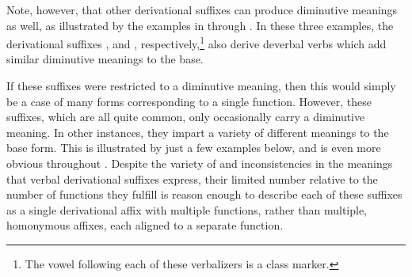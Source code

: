 Note, however, that other derivational suffixes can produce diminutive meanings as well, as illustrated by the examples in  through . 
\ea\label{verbDIMex4}
\z
\ea\label{verbDIMex5}
\z
\ea\label{verbDIMex6}
\z
In these three examples, the derivational suffixes ,  and , respectively,\footnote{The vowel following each of these verbalizers is a class marker.} 
also derive deverbal verbs which add similar diminutive meanings to the base. 

If these suffixes were restricted to a diminutive meaning, then this would simply be a case of many forms corresponding to a single function. However, these suffixes, which are all quite common, only occasionally carry a diminutive meaning. In other instances, they impart a variety of different meanings to the base form. This is illustrated by just a few examples below, and is even more obvious throughout \citet{Ruong1943}. Despite the variety of and inconsistencies in the meanings that verbal derivational suffixes express, their limited number relative to the number of functions they fulfill is reason enough to describe each of these suffixes as a single derivational affix with multiple functions, rather than multiple, homonymous affixes, each aligned to a separate function. 



